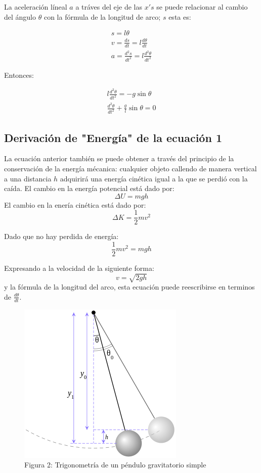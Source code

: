 \documentclass[12pt,letterpaper]{article}
\begin{document}
La aceleración líneal $a$ a tráves del eje de las $x's$ se puede relacionar al cambio del ángulo $\theta$ con la fórmula de la longitud de arco; $s$ esta es:

\begin{eqnarray}
\nonumber s = l\theta \\
\nonumber v = \frac{ds}{dt} = l\frac{d\theta}{dt} \\
\nonumber a = \frac{d^2 s}{dt^2} = l\frac{d^2 \theta}{dt^2}
\end{eqnarray}

Entonces: 

\begin{eqnarray}
\nonumber l\frac{d^2 \theta}{dt^2} = -g\sin\theta \\
\nonumber \frac{d^2 \theta}{dt^2} + \frac{g}{l}\sin\theta = 0
\end{eqnarray}

\subsection{Derivación de "Energía" de la ecuación 1}
La ecuación anterior también se puede obtener a través del principio de la conservación de la energía mécanica: cualquier objeto callendo de manera vertical a una distancia $ h $ adquirirá una energía cinética igual a la que se perdió con la caída. 
El cambio en la energía potencial está dado por: 
$$ \Delta U = mgh $$ 
El cambio en la enería cinética está dado por: 
$$ \Delta K = \frac{1}{2}mv^2 $$ 

Dado que no hay perdida de energía: 
$$ \frac{1}{2}mv^2 = mgh $$

Expresando a la velocidad de la siguiente forma: $$ v = \sqrt{2gh} $$  y la fórmula de la longitud del arco, esta ecuación puede reescribirse en terminos de $ \frac{d\theta}{dt} $.

\begin{figure}
\begin{center}
\includegraphics[scale=.3]{Pendulum2.png}
\caption{Figura 2: Trigonometría de un péndulo gravitatorio simple}
\end{center}
\end{figure}
\end{document}
